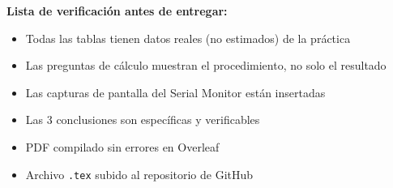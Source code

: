 \documentclass[11pt, letterpaper]{article}
\begin{document}
\vspace{0.5cm}

\begin{mdframed}[backgroundcolor=amberLight, linecolor=amberMain, linewidth=1pt,
  innerleftmargin=12pt, innerrightmargin=12pt,
  innertopmargin=8pt,  innerbottommargin=8pt]
  \textbf{\color{amberMain}Lista de verificaci\'on antes de entregar:}
  \begin{itemize}[leftmargin=1.5cm, label=$\boxtimes$, itemsep=3pt]
    \item Todas las tablas tienen datos reales (no estimados) de la pr\'actica
    \item Las preguntas de c\'alculo muestran el procedimiento, no solo el resultado
    \item Las capturas de pantalla del Serial Monitor est\'an insertadas
    \item Las 3 conclusiones son espec\'ificas y verificables
    \item PDF compilado sin errores en Overleaf
    \item Archivo \texttt{.tex} subido al repositorio de GitHub
  \end{itemize}
\end{mdframed}
\end{document}
